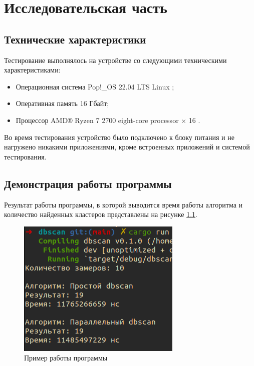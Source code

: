 \chapter{Исследовательская часть}
\section{Технические характеристики}
Тестирование выполнялось на устройстве со следующими техническими характеристиками:
\begin{itemize}
	\item Операционная система Pop!\_OS 22.04 LTS \cite{ubuntu} Linux \cite{linux};
	\item Оперативная память 16 Гбайт;
	\item Процессор AMD® Ryzen 7 2700 eight-core processor × 16 \cite{amd}.
\end{itemize}

Во время тестирования устройство было подключено к блоку питания и не нагружено никакими приложениями, кроме встроенных приложений и системой тестирования.

\section{Демонстрация работы программы}



 Результат работы программы, в которой выводится время работы алгоритма и количество найденных кластеров представлены на рисунке \ref{demonstration}.

\begin{figure}[ht!]
	\begin{center}
		\captionsetup{singlelinecheck = false, justification=centerfirst}
		\includegraphics[scale=0.8]{assets/demonstration.png}
		\caption{Пример работы программы}
		\label{demonstration}
	\end{center}
	
	
\end{figure}

